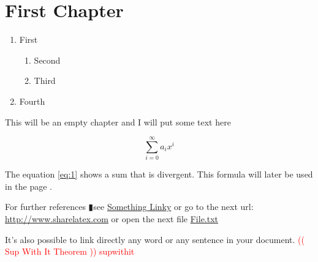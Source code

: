 \documentclass{book}
\newcommand{\ann}[1]{(( #1 ))}
\newcommand{\df}[2]{\hypertarget{#1}{\textcolor{red}{\ann{#2} #1}}}
\newcommand{\pipe}{$\vrectangleblack$}
\begin{document}
 
\tableofcontents
 
\chapter{First Chapter}

\begin{enumerate}
  \item First
  \begin{enumerate}
    \item Second
    \item Third
  \end{enumerate}
  \item Fourth
\end{enumerate}


This will be an empty chapter and I will put some text here
 
\begin{equation}
\label{eq:1}
\sum_{i=0}^{\infty} a_i x^i
\end{equation}
 
The equation \ref{eq:1} shows a sum that is divergent. This formula 
will later be used in the page \pageref{second}.
 
For further references \pipe see \href{http://www.sharelatex.com}{Something 
Linky} or go to the next url: \url{http://www.sharelatex.com} or open 
the next file \href{run:./file.txt}{File.txt}
 
It's also possible to link directly any word or 
\hypertarget{thesentence}{any sentence} in your document.
\df{supwithit}{Sup With It Theorem}
\end{document}
